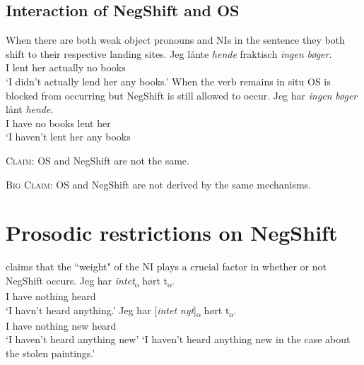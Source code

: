 \documentclass[12pt, letterpaper]{article}
\begin{document}
\subsection{Interaction of NegShift and OS} \label{sec:NEG-OS}
\ea When there are both weak object pronouns and NIs in the sentence they both shift to their respective landing sites. 
	\ea
	\label{ex:NegOS}
	\gll Jeg lånte \textit{hende} fraktisch \textit{ingen} \textit{bøger}.\\
	I lent her actually no books\\
	\glt `I didn't actually lend her any books.'
	\z 
\ex When the verb remains in situ OS is blocked from occurring but NegShift is still allowed to occur. 
	\ea 
	\gll Jeg har \emph{ingen} \emph{bøger} lånt \emph{hende}.\\
	I have no books lent her\\
	\glt `I haven't lent her any books
	\z
\z

\begin{tcolorbox}[width=\linewidth]
\textsc{Claim:} OS and NegShift are not the same.

\textsc{Big Claim:} OS and NegShift are not derived by the same mechanisms. 
\end{tcolorbox}
\section{Prosodic restrictions on NegShift} \label{sec:PROSODY}

\ea \citet[65f]{christensenInterfacesNegationSyntax2005} claims that the ``weight" of the NI plays a crucial factor in whether or not NegShift occurs. 
	\ea 
	\gll Jeg har \textit{intet}\textsubscript{o} hørt t\textsubscript{o}.\\
	I have nothing heard\\
	\glt  `I havn't heard anything.'
	\ex 
	\gll Jeg har [\textit{intet} \textit{nyt}]\textsubscript{o} hørt t\textsubscript{o}.\\
	I have nothing new heard\\
	\glt `I haven't heard anything new'
	\glt `I haven't heard anything new in the case about the stolen paintings.'
	\z
\end{document}
